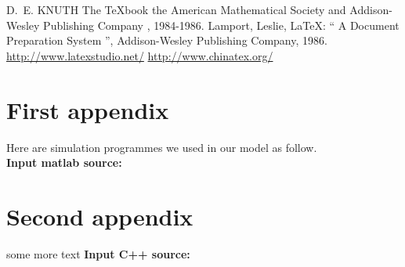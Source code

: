 \documentclass{mcmthesis}
\begin{document}
\begin{thebibliography}{99}
 D.~E. KNUTH   The \TeX{}book  the American
Mathematical Society and Addison-Wesley
Publishing Company , 1984-1986.
Lamport, Leslie,  \LaTeX{}: `` A Document Preparation System '',
Addison-Wesley Publishing Company, 1986.
\url{http://www.latexstudio.net/}
\url{http://www.chinatex.org/}
\end{thebibliography}

\begin{appendices}

\section{First appendix}



Here are simulation programmes we used in our model as follow.\\

\textbf{\textcolor[rgb]{0.98,0.00,0.00}{Input matlab source:}}


\section{Second appendix}

some more text \textcolor[rgb]{0.98,0.00,0.00}{\textbf{Input C++ source:}}


\end{appendices}
\end{document}
